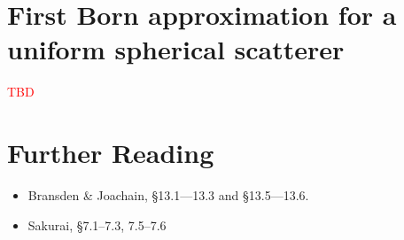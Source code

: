 \documentclass[pra,11pt]{revtex4}
\begin{document}
\section{First Born approximation for a uniform spherical scatterer}

\textcolor{red}{TBD}


\section{Further Reading}

\begin{itemize}
\item Bransden \& Joachain, \S13.1---13.3 and \S13.5---13.6.
\item Sakurai, \S7.1--7.3, 7.5--7.6

\end{itemize}
\end{document}
